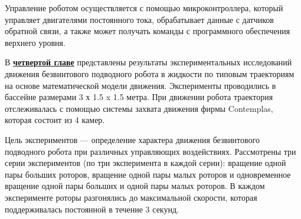 



%


Управление роботом осуществляется с помощью микроконтроллера, который управляет двигателями постоянного тока, обрабатывает данные с датчиков обратной связи, а также может получать команды с программного обеспечения верхнего уровня.














В \underline{\textbf{четвертой главе}} представлены результаты экспериментальных исследований движения безвинтового подводного робота в жидкости по типовым траекториям на основе математической модели движения. Эксперименты проводились в бассейне размерами 3 х 1.5 x 1.5 метра. При движении робота траектория отслеживалась с помощью системы захвата движения фирмы Contemplas, которая состоит из 4 камер.%

Цель экспериментов --- определение характера движения безвинтового подводного робота при различных управляющих воздействиях. 
Рассмотрены три серии экспериментов (по три эксперимента в каждой серии): вращение одной пары больших роторов, вращение одной пары малых роторов и одновременное вращение одной пары больших и одной пары малых роторов. В каждом эксперименте роторы разгонялись до максимальной скорости, которая поддерживалась постоянной в течение 3 секунд.

